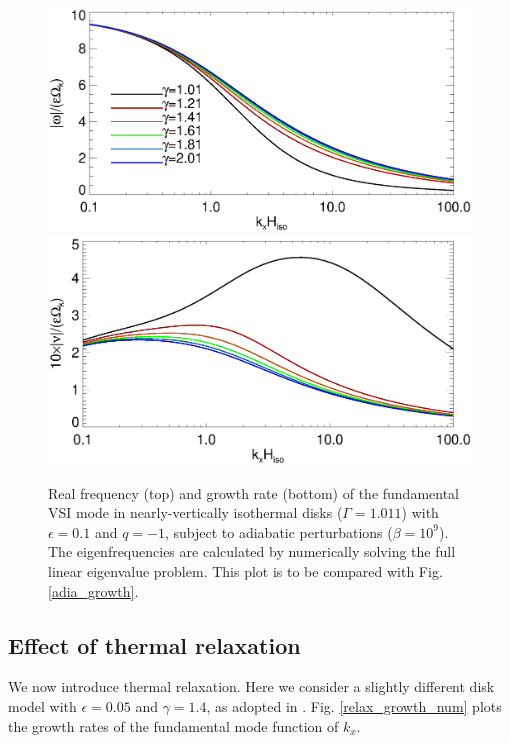 \begin{figure}
  \includegraphics[width=\linewidth,clip=true,trim=0cm 1.75cm 0cm 0cm]{figures/compare_eigen_real1}
  \includegraphics[width=\linewidth,clip=true,trim=0cm 0cm 0cm 1cm]{figures/compare_eigen_imag1}
  \caption{Real frequency (top) and growth rate 
    (bottom) of the fundamental VSI mode in nearly-vertically   
    isothermal disks ($\Gamma=1.011$) with $\epsilon=0.1$ and  
    $q=-1$, subject to adiabatic perturbations
    ($\beta=10^9$). The eigenfrequencies are calculated by numerically
    solving the full linear eigenvalue problem. This plot is to
    be compared with Fig. \ref{adia_growth}. \label{adia_growth_num}}   
\end{figure}   

\subsection{Effect of thermal relaxation}
We now introduce thermal relaxation. Here we consider a slightly
different disk model with $\epsilon=0.05$ and $\gamma=1.4$, as
adopted in \cite{nelson13}. Fig. \ref{relax_growth_num} plots the
growth rates of the fundamental mode function of $k_x$. %

